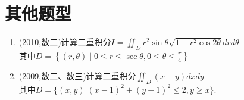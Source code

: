 \documentclass[12pt, a4paper, oneside, UTF8]{ctexbook}
\begin{document}
\section{其他题型}

\begin{enumerate}[label=\arabic*.,start=12]
    \item (2010,数二)计算二重积分$\displaystyle I=\iint_D r^2\sin\theta\sqrt{1-r^2\cos 2\theta} drd\theta$ \\
    其中$\displaystyle D=\left\{(r,\theta)\mid 0\leq r\leq\sec{\theta},0\leq\theta\leq\frac{\pi}{4}\right\}$
    
    \begin{solution}
    \newpage
    \end{solution}
    
    \item (2009,数二、数三)计算二重积分$\iint_D(x-y)dxdy$\\
    其中$\displaystyle D=\{(x,y)|(x-1)^2+(y-1)^2\leq 2,y\geq x\}$.
    
    \begin{solution}
    \newpage
    \end{solution}
\end{enumerate}

\ifx\allfiles\undefined
\end{document}
